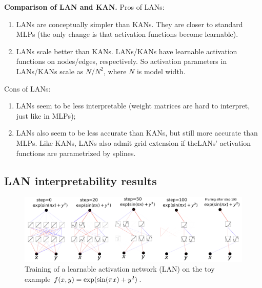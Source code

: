 \documentclass{article}
\numberwithin{equation}{section}
\numberwithin{figure}{section}
\begin{document}
{\bf Comparison of LAN and KAN.}
Pros of LANs: 
\begin{enumerate}[(1)]
    \item LANs are conceptually simpler than KANs. They are closer to standard MLPs (the only change is that activation functions become learnable).
    \item LANs scale better than KANs. LANs/KANs have learnable activation functions on nodes/edges, respectively. So activation parameters in LANs/KANs scale as $N$/$N^2$, where $N$ is model width.
\end{enumerate}
Cons of LANs: 
\begin{enumerate}[(1)]
    \item LANs seem to be less interpretable (weight matrices are hard to interpret, just like in MLPs);
    \item LANs also seem to be less accurate than KANs, but still more accurate than MLPs. Like KANs, LANs also admit grid extension if theLANs' activation functions are parametrized by splines.
\end{enumerate}


\subsection{LAN interpretability results}

\begin{figure}[t]
    \centering
    \includegraphics[width=1\linewidth]{figs/lan_toy_interpretability_evolution.png}
    \caption{Training of a learnable activation network (LAN) on the toy example $f(x,y)={\rm exp}({\rm sin}(\pi x)+y^2)$.}
    \label{fig:lan-train}
\end{figure}
\end{document}

